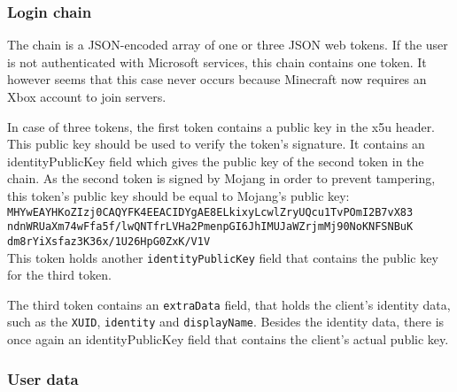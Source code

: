 
\subsubsection{Login chain}\label{subsubsec:login-chain}

The chain is a JSON-encoded array of one or three JSON web tokens.
If the user is not authenticated with Microsoft services, this chain contains one token.
It however seems that this case never occurs because Minecraft now requires an Xbox account to join servers.

In case of three tokens, the first token contains a public key in the x5u header.
This public key should be used to verify the token's signature.
It contains an identityPublicKey field which gives the public key of the second token in the chain.
As the second token is signed by Mojang in order to prevent tampering, 
this token's public key should be equal to Mojang's public key: \\

\noindent
\texttt{MHYwEAYHKoZIzj0CAQYFK4EEACIDYgAE8ELkixyLcwlZryUQcu1TvPOmI2B7vX83\\ndnWRUaXm74wFfa5f/lwQNTfrLVHa2PmenpGI6JhIMUJaWZrjmMj90NoKNFSNBuK\\dm8rYiXsfaz3K36x/1U26HpG0ZxK/V1V}
\\

\noindent
This token holds another \texttt{identityPublicKey} field that contains the public key for the third token.

The third token contains an \texttt{extraData} field, that holds the client's identity data,
such as the \texttt{XUID}, \texttt{identity} and \texttt{displayName}.
Besides the identity data, there is once again an identityPublicKey field that contains the client's actual public key.

\subsubsection{User data}\label{subsubsec:user-data}

